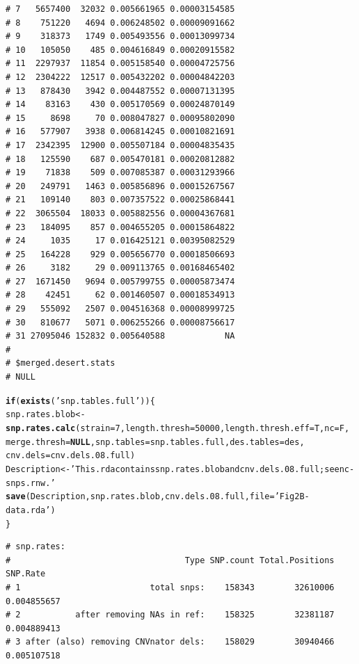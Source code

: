 \documentclass{article}\usepackage[]{graphicx}\usepackage[]{color}
\makeatletter
\newcommand{\hlnum}[1]{\textcolor[rgb]{0.686,0.059,0.569}{#1}}%
\newcommand{\hlstr}[1]{\textcolor[rgb]{0.192,0.494,0.8}{#1}}%
\newcommand{\hlstd}[1]{\textcolor[rgb]{0.345,0.345,0.345}{#1}}%
\newcommand{\hlkwa}[1]{\textcolor[rgb]{0.161,0.373,0.58}{\textbf{#1}}}%
\newcommand{\hlkwb}[1]{\textcolor[rgb]{0.69,0.353,0.396}{#1}}%
\newcommand{\hlkwc}[1]{\textcolor[rgb]{0.333,0.667,0.333}{#1}}%
\newcommand{\hlkwd}[1]{\textcolor[rgb]{0.737,0.353,0.396}{\textbf{#1}}}%
\newenvironment{kframe}{%
 \def\at@end@of@kframe{}%
 \ifinner\ifhmode%
  \def\at@end@of@kframe{\end{minipage}}%
  \begin{minipage}{\columnwidth}%
 \fi\fi%
 \def\FrameCommand##1{\hskip\@totalleftmargin \hskip-\fboxsep
 \colorbox{shadecolor}{##1}\hskip-\fboxsep
     \hskip-\linewidth \hskip-\@totalleftmargin \hskip\columnwidth}%
 \MakeFramed {\advance\hsize-\width
   \@totalleftmargin\z@ \linewidth\hsize
   \@setminipage}}%
 {\par\unskip\endMakeFramed%
 \at@end@of@kframe}
\newenvironment{knitrout}{}{} %
\makeatother
\begin{document}
\begin{knitrout}
\begin{kframe}
\begin{verbatim}
# 7   5657400  32032 0.005661965 0.00003154585
# 8    751220   4694 0.006248502 0.00009091662
# 9    318373   1749 0.005493556 0.00013099734
# 10   105050    485 0.004616849 0.00020915582
# 11  2297937  11854 0.005158540 0.00004725756
# 12  2304222  12517 0.005432202 0.00004842203
# 13   878430   3942 0.004487552 0.00007131395
# 14    83163    430 0.005170569 0.00024870149
# 15     8698     70 0.008047827 0.00095802090
# 16   577907   3938 0.006814245 0.00010821691
# 17  2342395  12900 0.005507184 0.00004835435
# 18   125590    687 0.005470181 0.00020812882
# 19    71838    509 0.007085387 0.00031293966
# 20   249791   1463 0.005856896 0.00015267567
# 21   109140    803 0.007357522 0.00025868441
# 22  3065504  18033 0.005882556 0.00004367681
# 23   184095    857 0.004655205 0.00015864822
# 24     1035     17 0.016425121 0.00395082529
# 25   164228    929 0.005656770 0.00018506693
# 26     3182     29 0.009113765 0.00168465402
# 27  1671450   9694 0.005799755 0.00005873474
# 28    42451     62 0.001460507 0.00018534913
# 29   555092   2507 0.004516368 0.00008999725
# 30   810677   5071 0.006255266 0.00008756617
# 31 27095046 152832 0.005640588            NA
# 
# $merged.desert.stats
# NULL
\end{verbatim}
\end{kframe}
\end{knitrout}
\begin{knitrout}\footnotesize
{}\color{fgcolor}\begin{kframe}
\begin{alltt}
\hlkwa{if}\hlstd{(}\hlkwd{exists}\hlstd{(}\hlstr{'snp.tables.full'}\hlstd{))\{}
  \hlstd{snp.rates.blob} \hlkwb{<-} \hlkwd{snp.rates.calc}\hlstd{(}\hlkwc{strain}\hlstd{=}\hlnum{7}\hlstd{,} \hlkwc{length.thresh}\hlstd{=}\hlnum{50000}\hlstd{,} \hlkwc{length.thresh.eff}\hlstd{=T,} \hlkwc{nc}\hlstd{=F,}
                                   \hlkwc{merge.thresh}\hlstd{=}\hlkwa{NULL}\hlstd{,} \hlkwc{snp.tables}\hlstd{=snp.tables.full,} \hlkwc{des.tables}\hlstd{=des,}
                                   \hlkwc{cnv.dels}\hlstd{=cnv.dels.08.full)}
  \hlstd{Description} \hlkwb{<-} \hlstr{'This .rda contains snp.rates.blob and cnv.dels.08.full; see nc-snps.rnw.'}
  \hlkwd{save}\hlstd{(Description, snp.rates.blob, cnv.dels.08.full,} \hlkwc{file}\hlstd{=}\hlstr{'Fig2B-data.rda'}\hlstd{)}
\hlstd{\}}
\end{alltt}
\begin{verbatim}
# snp.rates:
#                                   Type SNP.count Total.Positions    SNP.Rate
# 1                          total snps:    158343        32610006 0.004855657
# 2           after removing NAs in ref:    158325        32381187 0.004889413
# 3 after (also) removing CNVnator dels:    158029        30940466 0.005107518
\end{verbatim}
\end{kframe}
\end{knitrout}
\end{document}
